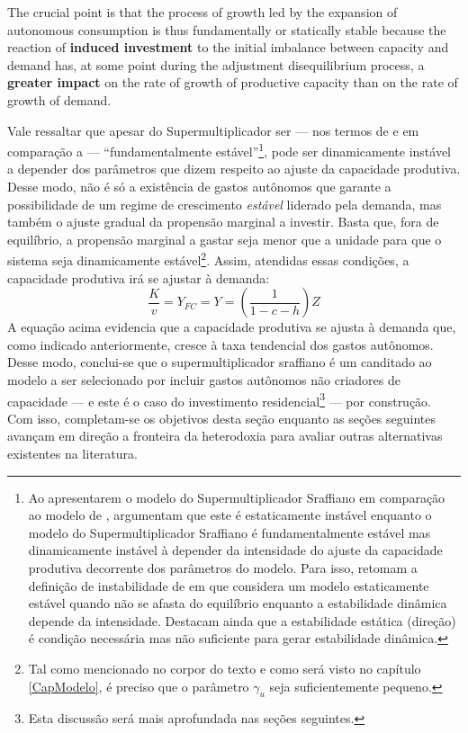 \begin{citacao}
The crucial point is that the process of growth led by the expansion of autonomous consumption is thus fundamentally or statically stable because the reaction of \textbf{induced investment} to the initial imbalance between capacity and demand has, at some point during the adjustment disequilibrium process, a \textbf{greater impact} on the rate of growth of productive capacity than on the rate of growth of demand. \cite[p.~19, grifos adicionados]{serrano_trouble_2017}
\end{citacao}

Vale ressaltar que apesar do Supermultiplicador ser --- nos termos de \textcite{hicks_capital_1965} e em comparação a \textcite{harrod_essay_1939} --- ``fundamentalmente estável''\footnote{
	Ao apresentarem o modelo do Supermultiplicador Sraffiano em comparação ao modelo de \textcite{harrod_essay_1939}, \textcite{serrano_trouble_2017} argumentam que este é estaticamente instável enquanto o modelo do Supermultiplicador Sraffiano é fundamentalmente estável mas dinamicamente instável à depender da intensidade do ajuste da capacidade produtiva decorrente dos parâmetros do modelo.
	Para isso, retomam a definição de instabilidade de \textcite{hicks_contribution_1972} em que considera um modelo estaticamente estável quando não se afasta do equilíbrio enquanto a estabilidade dinâmica depende da intensidade. Destacam ainda que a estabilidade estática (direção) é condição necessária mas não suficiente para gerar estabilidade dinâmica.
}, pode ser dinamicamente instável a depender dos parâmetros que dizem respeito ao ajuste da capacidade produtiva. Desse modo, não é só a existência de gastos autônomos que garante a possibilidade de um regime de crescimento \textit{estável} liderado pela demanda, mas também o ajuste gradual da propensão marginal a investir. Basta que, fora de equilíbrio, a propensão marginal a gastar seja menor que a unidade para que o sistema seja dinamicamente estável\footnote{Tal como mencionado no corpor do texto e como será visto no capítulo \ref{CapModelo}, é preciso que o parâmetro $\gamma_u$ seja suficientemente pequeno.}. Assim, atendidas essas condições, a capacidade produtiva irá se ajustar à demanda:
$$
 \frac{K}{v} = Y_{FC} = Y = \left(\frac{1}{1 - c - h}\right)Z
$$
A equação acima evidencia que a capacidade produtiva se ajusta à demanda que, como indicado anteriormente, cresce à taxa tendencial dos gastos autônomos. 
Desse modo, conclui-se que o supermultiplicador sraffiano é um canditado ao modelo a ser selecionado por incluir gastos autônomos não criadores de capacidade --- e este é o caso do investimento residencial\footnote{Esta discussão será mais aprofundada nas seções seguintes.} --- por construção.
Com isso, completam-se os objetivos desta seção enquanto as seções seguintes avançam em direção a fronteira da heterodoxia para avaliar outras alternativas existentes na literatura.

